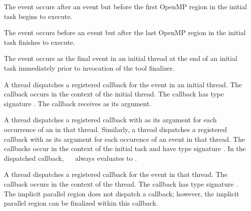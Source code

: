 The  event occurs after an  event
but before the first OpenMP region in the initial task begins to execute.

The  event occurs before an  event
but after the last OpenMP region in the initial task finishes to execute.

The  event occurs as the final event in an initial thread 
at the end of an initial task immediately prior to invocation of the tool finalizer.

\tools

A thread dispatches a registered 
callback for the  event in an initial thread.
The callback occurs in the context of the initial thread.
The callback has type signature .
The callback receives  as its  argument.

A thread dispatches a registered 
callback with  as its  argument
for each occurrence of an  in that thread.
Similarly, a thread dispatches a registered 
callback with  as its  argument
for each occurence of an  event in that thread. 
The callbacks occur in the context of the initial task and have type 
signature . In the dispatched
callback, \code{(}~\code{&}~ always evaluates to
.

A thread dispatches a registered 
callback for the  event in that thread.
The callback occurs in the context of the thread.  The callback has type signature
. The implicit parallel region does not dispatch 
a  callback; however, the implicit parallel region 
can be finalized within this  callback.

